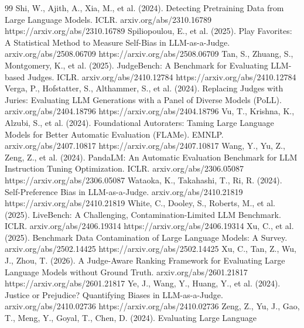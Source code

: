 \begin{thebibliography}{99}
\label{r36} Shi, W., Ajith, A., Xia, M., et al. (2024). Detecting Pretraining Data from Large Language
    Models. ICLR. arxiv.org/abs/2310.16789 https://arxiv.org/abs/2310.16789
\label{r16} Spiliopoulou, E., et al. (2025). Play Favorites: A Statistical Method to Measure Self-Bias in
    LLM-as-a-Judge. arxiv.org/abs/2508.06709 https://arxiv.org/abs/2508.06709
\label{r6} Tan, S., Zhuang, S., Montgomery, K., et al. (2025). JudgeBench: A Benchmark for Evaluating LLM-based
    Judges. ICLR. arxiv.org/abs/2410.12784 https://arxiv.org/abs/2410.12784
\label{r5} Verga, P., Hofstatter, S., Althammer, S., et al. (2024). Replacing Judges with Juries: Evaluating LLM
    Generations with a Panel of Diverse Models (PoLL). arxiv.org/abs/2404.18796 https://arxiv.org/abs/2404.18796
\label{r4} Vu, T., Krishna, K., Alzubi, S., et al. (2024). Foundational Autoraters: Taming Large Language Models
    for Better Automatic Evaluation (FLAMe). EMNLP. arxiv.org/abs/2407.10817 https://arxiv.org/abs/2407.10817
\label{r34} Wang, Y., Yu, Z., Zeng, Z., et al. (2024). PandaLM: An Automatic Evaluation Benchmark for LLM
    Instruction Tuning Optimization. ICLR. arxiv.org/abs/2306.05087 https://arxiv.org/abs/2306.05087
\label{r18} Wataoka, K., Takahashi, T., Ri, R. (2024). Self-Preference Bias in LLM-as-a-Judge. arxiv.org/abs/2410.21819 https://arxiv.org/abs/2410.21819
\label{r22} White, C., Dooley, S., Roberts, M., et al. (2025). LiveBench: A Challenging, Contamination-Limited
    LLM Benchmark. ICLR. arxiv.org/abs/2406.19314 https://arxiv.org/abs/2406.19314
\label{r13} Xu, C., et al. (2025). Benchmark Data Contamination of Large Language Models: A Survey. arxiv.org/abs/2502.14425 https://arxiv.org/abs/2502.14425
\label{r29} Xu, C., Tan, Z., Wu, J., Zhou, T. (2026). A Judge-Aware Ranking Framework for Evaluating Large
    Language Models without Ground Truth. arxiv.org/abs/2601.21817 https://arxiv.org/abs/2601.21817
\label{r17} Ye, J., Wang, Y., Huang, Y., et al. (2024). Justice or Prejudice? Quantifying Biases in
    LLM-as-a-Judge. arxiv.org/abs/2410.02736 https://arxiv.org/abs/2410.02736
\label{r38} Zeng, Z., Yu, J., Gao, T., Meng, Y., Goyal, T., Chen, D. (2024). Evaluating Large Language

\end{thebibliography}
